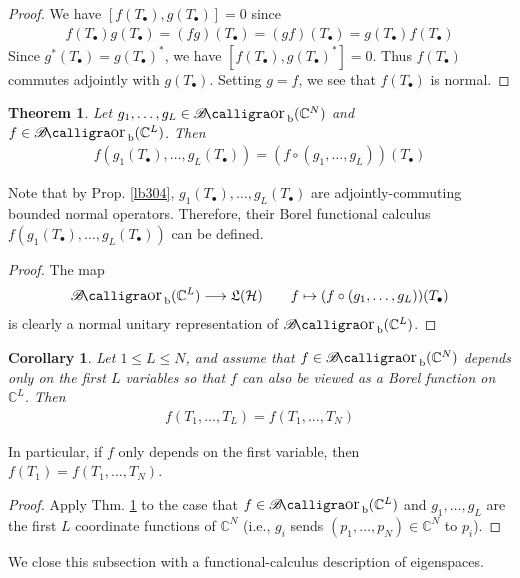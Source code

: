 \documentclass[12pt,b5paper,notitlepage]{article}
\theoremstyle{definition}
\theoremstyle{plain}
\newtheorem{thm}[df]{Theorem}
\newtheorem{co}[df]{Corollary}
\DeclareMathOperator{\Borb}{{\mathscr{B}\text{\kern -2pt {\calligra\large or}}\,}_{\mathrm b}}
\newcommand{\fk}{\mathfrak}
\newcommand{\blt}{\bullet}
\newcommand{\Cbb}{\mathbb C}
\newcommand{\MH}{\mathcal H}
\numberwithin{equation}{section}
\begin{document}
\begin{proof}
We have $[f(T_\blt),g(T_\blt)]=0$ since
\begin{align*}
f(T_\blt)g(T_\blt)=(fg)(T_\blt)=(gf)(T_\blt)=g(T_\blt)f(T_\blt)
\end{align*}
Since $g^*(T_\blt)=g(T_\blt)^*$, we have $[f(T_\blt),g(T_\blt)^*]=0$. Thus $f(T_\blt)$ commutes adjointly with $g(T_\blt)$. Setting $g=f$, we see that $f(T_\blt)$ is normal.
\end{proof}


\begin{thm}\label{lb306}
Let $g_1,\dots,g_L\in\Borb(\Cbb^N)$ and $f\in\Borb(\Cbb^L)$. Then
\begin{align}\label{eq165}
f(g_1(T_\blt),\dots,g_L(T_\blt))=(f\circ(g_1,\dots,g_L))(T_\blt)
\end{align}
\end{thm}

Note that by Prop. \ref{lb304}, $g_1(T_\blt),\dots,g_L(T_\blt)$ are adjointly-commuting bounded normal operators. Therefore, their Borel functional calculus $f(g_1(T_\blt),\dots,g_L(T_\blt))$ can be defined.


\begin{proof}
The map
\begin{align*}
\Borb(\Cbb^L)\longrightarrow\fk L(\MH)\qquad f\mapsto (f\circ(g_1,\dots,g_L))(T_\blt)
\end{align*}
is clearly a normal unitary representation of $\Borb(\Cbb^L)$.
\end{proof}


\begin{co}\label{lb308}
Let $1\leq L\leq N$, and assume that $f\in\Borb(\Cbb^N)$ depends only on the first $L$ variables so that $f$ can also be viewed as a Borel function on $\Cbb^L$. Then
\begin{align*}
f(T_1,\dots,T_L)=f(T_1,\dots,T_N)
\end{align*} 
\end{co}

In particular, if $f$ only depends on the first variable, then $f(T_1)=f(T_1,\dots,T_N)$.

\begin{proof}
Apply Thm. \ref{lb306} to the case that $f\in\Borb(\Cbb^L)$ and $g_1,\dots,g_L$ are the first $L$ coordinate functions of $\Cbb^N$ (i.e., $g_i$ sends $(p_1,\dots,p_N)\in\Cbb^N$ to $p_i$).
\end{proof}



We close this subsection with a functional-calculus description of eigenspaces.
\end{document}
